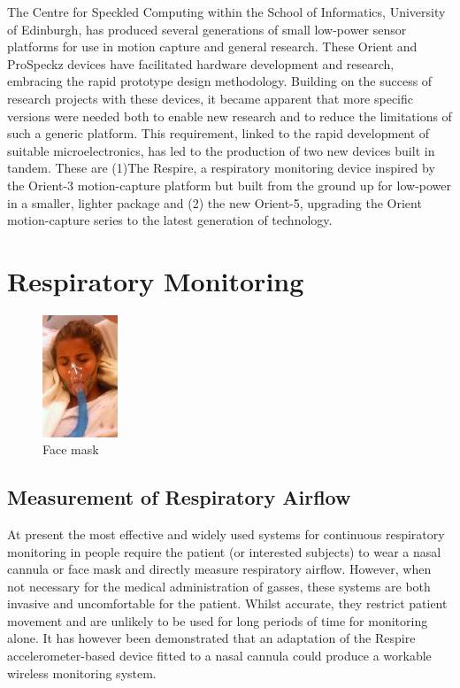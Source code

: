 The Centre for Speckled Computing within the School of Informatics, University of
Edinburgh, has produced several generations of small low-power sensor platforms for use
in motion capture and general research. These Orient\cite{Orient2012} and ProSpeckz\cite{ProSpeckz2012} devices
have facilitated hardware development and research, embracing the rapid prototype
design methodology. Building on the success of research projects with these devices, it
became apparent that more specific versions were needed both to enable new research and to
reduce the limitations of such a generic platform. This requirement, linked to the rapid development
of suitable microelectronics, has led to the production of two new devices built in tandem. These are
(1)The Respire, a respiratory monitoring device inspired by the Orient-3 motion-capture platform
but built from the ground up for low-power in a smaller, lighter package and (2) the new Orient-5,
upgrading the Orient motion-capture series to the latest generation of technology.

\section{Respiratory Monitoring}

\begin{figure}
  \vspace{-10pt}
  \begin{center}
    \includegraphics[width=0.2\textwidth, keepaspectratio=true]{images/Plastic_oxygen_mask_on_an_ER_patient.jpg}
  \end{center}
  \caption[Face Mask]{Face mask \cite{FaceMaskImg}}
  \vspace{-10pt}
\end{figure}

\subsection{Measurement of Respiratory Airflow}
At present the most effective and widely used systems for continuous respiratory monitoring in
people require the patient (or interested subjects) to wear a nasal cannula or face mask and directly
measure respiratory airflow. However, when not necessary for the medical administration of gasses,
these systems are both invasive and uncomfortable for the patient\cite{NasalCannula2011}. Whilst accurate, they
restrict patient movement and are unlikely to be used for long periods of time for monitoring alone.
It has however been demonstrated that an adaptation of the Respire accelerometer-based device
fitted to a nasal cannula could produce a workable wireless monitoring system.


